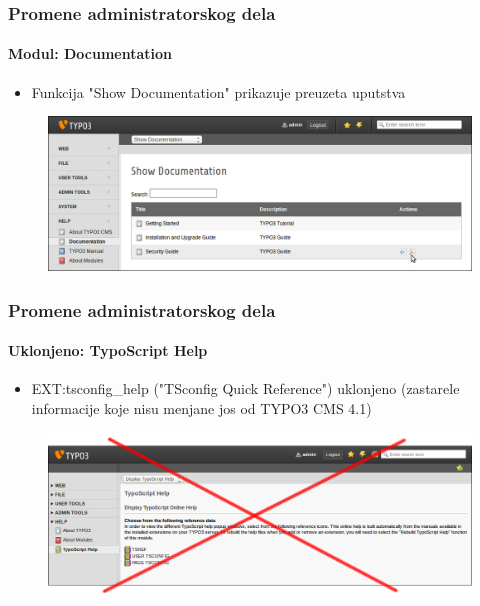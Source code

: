 \begin{frame}[fragile]
	\frametitle{Promene administratorskog dela}
	\framesubtitle{Modul: Documentation}

	\begin{itemize}
		\item Funkcija "Show Documentation" prikazuje preuzeta uputstva
	\end{itemize}

	\begin{figure}
		\includegraphics[width=0.95\linewidth]{Images/BackendChanges/ShowDocumentation.png}
	\end{figure}

\end{frame}


\begin{frame}[fragile]
	\frametitle{Promene administratorskog dela}
	\framesubtitle{Uklonjeno: TypoScript Help}

 	\begin{itemize}
		\item EXT:tsconfig\_help ("TSconfig Quick Reference") uklonjeno\newline
			\small(zastarele informacije koje nisu menjane jos od TYPO3 CMS 4.1)
	\end{itemize}

	\begin{figure}
		\includegraphics[width=0.95\linewidth]{Images/BackendChanges/TypoScriptHelpRemovedCrossed.png}
	\end{figure}

\end{frame}


